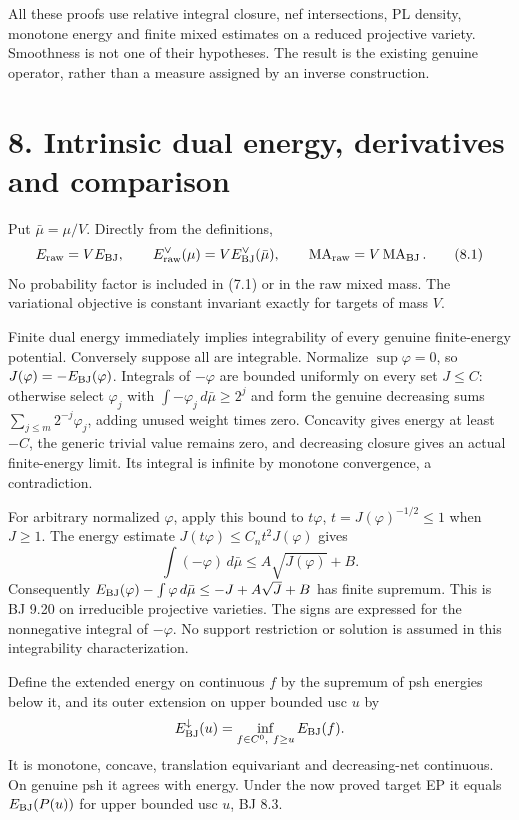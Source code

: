 \documentclass[
  10pt,
]{article}
\begin{document}
All these proofs use relative integral closure, nef intersections, PL
density, monotone energy and finite mixed estimates on a reduced
projective variety. Smoothness is not one of their hypotheses. The
result is the existing genuine operator, rather than a measure assigned
by an inverse construction.

\section{8. Intrinsic dual energy, derivatives and
comparison}\label{intrinsic-dual-energy-derivatives-and-comparison}

Put \(\bar\mu=\mu/V\). Directly from the definitions,
\[E_{\rm raw}=V E_{\rm BJ},\qquad
 E_{\rm raw}^{\vee}(\mu)=V E_{\rm BJ}^{\vee}(\bar\mu),\qquad
 \operatorname{MA}_{\rm raw}=V\operatorname{MA}_{\rm BJ}. \tag{8.1}\] No
probability factor is included in (7.1) or in the raw mixed mass. The
variational objective is constant invariant exactly for targets of mass
\(V\).

Finite dual energy immediately implies integrability of every genuine
finite-energy potential. Conversely suppose all are integrable.
Normalize \(\sup\varphi=0\), so \(J(\varphi)=-E_{\rm BJ}(\varphi)\).
Integrals of \(-\varphi\) are bounded uniformly on every set \(J\le C\):
otherwise select \(\varphi_j\) with \(\int-\varphi_j\,d\bar\mu\ge2^j\)
and form the genuine decreasing sums \(\sum_{j\le m}2^{-j}\varphi_j\),
adding unused weight times zero. Concavity gives energy at least \(-C\),
the generic trivial value remains zero, and decreasing closure gives an
actual finite-energy limit. Its integral is infinite by monotone
convergence, a contradiction.

For arbitrary normalized \(\varphi\), apply this bound to \(t\varphi\),
\(t=J(\varphi)^{-1/2}\le1\) when \(J\ge1\). The energy estimate
\(J(t\varphi)\le C_n t^2J(\varphi)\) gives
\[\int(-\varphi)\,d\bar\mu\le A\sqrt{J(\varphi)}+B.\] Consequently
\(E_{\rm BJ}(\varphi)-\int\varphi\,d\bar\mu\le-J+A\sqrt J+B\) has finite
supremum. This is BJ 9.20 on irreducible projective varieties. The signs
are expressed for the nonnegative integral of \(-\varphi\). No support
restriction or solution is assumed in this integrability
characterization.

Define the extended energy on continuous \(f\) by the supremum of psh
energies below it, and its outer extension on upper bounded usc \(u\) by
\[E_{\rm BJ}^{\downarrow}(u)=\inf_{f\in C^0,\ f\ge u}E_{\rm BJ}(f).\] It
is monotone, concave, translation equivariant and decreasing-net
continuous. On genuine psh it agrees with energy. Under the now proved
target EP it equals \(E_{\rm BJ}(P(u))\) for upper bounded usc \(u\), BJ
8.3.
\end{document}
